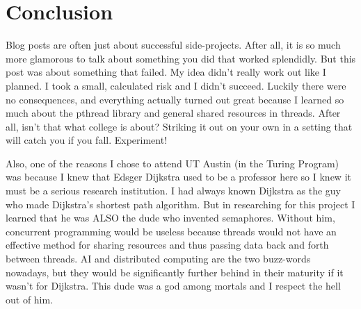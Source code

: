 \documentclass[12pt]{article}
\begin{document}
  \section{Conclusion}

    Blog posts are often just about successful side-projects. After all, it is so much more glamorous to talk about something you did that worked splendidly. But this post was about something that failed. My idea didn't really work out like I planned. I took a small, calculated risk and I didn't succeed. Luckily there were no consequences, and everything actually turned out great because I learned so much about the pthread library and general shared resources in threads. After all, isn't that what college is about? Striking it out on your own in a setting that will catch you if you fall. Experiment!

    Also, one of the reasons I chose to attend UT Austin (in the Turing Program) was because I knew that Edsger Dijkstra used to be a professor here so I knew it must be a serious research institution. I had always known Dijkstra as the guy who made Dijkstra's shortest path algorithm. But in researching for this project I learned that he was ALSO the dude who invented semaphores. Without him, concurrent programming would be useless because threads would not have an effective method for sharing resources and thus passing data back and forth between threads. AI and distributed computing are the two buzz-words nowadays, but they would be significantly further behind in their maturity if it wasn't for Dijkstra. This dude was a god among mortals and I respect the hell out of him. 
      
\end{document}
